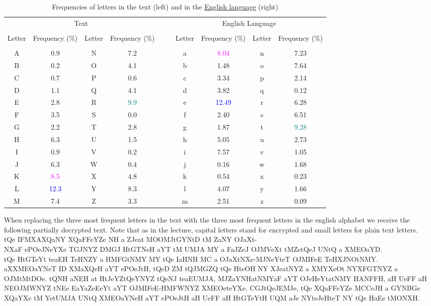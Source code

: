 \documentclass[12pt]{article}
\begin{document}
\begin{table}[h!]
	\centering
	\resizebox{\textwidth}{!} {
	\begin{tabular}{c c c c c c c c c c }
		\multicolumn{4}{c}{Text} && & \multicolumn{4}{c}{English Language}\\
		\cline{1-4} \cline{7-10}
		&&&&&&&&&\\[-3.3mm]
		Letter & Frequency (\%) & Letter & Frequency (\%) &&& Letter & Frequency (\%) & Letter & Frequency (\%)\\ [1mm]
		\cline{1-4} \cline{7-10}
		&&&&&&&&&\\[-3.5mm]
		A & 0.9 & N & 7.2&&&a & \textcolor{magenta}{8.04} & n & 7.23\\
		B & 0.2 & O & 4.1&&&b & 1.48 & o & 7.64\\
		C & 0.7 & P & 0.6&&&c & 3.34 & p & 2.14\\
		D & 1.1 & Q & 4.1&&&d & 3.82 & q & 0.12\\
		E & 2.8 & R & \textcolor{teal}{9.9}&&&e & \textcolor{blue}{12.49} & r & 6.28\\
		F & 3.5 & S & 0.0&&&f & 2.40 & s & 6.51\\
		G & 2.2 & T & 2.8&&&g & 1.87 & t & \textcolor{teal}{9.28}\\
		H & 6.3 & U & 1.5&&&h & 5.05 & u & 2.73\\
		I & 0.9 & V & 0.2&&&i & 7.57 & v & 1.05\\
		J & 6.3 & W & 0.4&&&j & 0.16 & w & 1.68\\
		K & \textcolor{magenta}{8.5} & X & 4.8&&&k & 0.54 & x & 0.23\\
		L & \textcolor{blue}{12.3} & Y & 8.3&&&l & 4.07 & y & 1.66\\
		M & 7.4 & Z & 3.3&&&m & 2.51 & z & 0.09\\
		\cline{1-4} \cline{7-10}
\end{tabular}}
\caption{Frequencies of letters in the text (left) and in the \href{http://norvig.com/mayzner.html}{English language} (right)}
\end{table}

When replacing the three most frequent letters in the text with the three most frequent letters in the english alphabet we receive the following partially decrypted text. Note that as in the lecture, capital letters stand for encrypted and small letters for plain text letters.
\newpage
tQe IFMXAXQaNY XQaFFeYZe NH a ZJeat MOOMJtGYNtD tM ZaNY OJaXt-\\NXaF ePOeJNeYXe TGJNYZ DMGJ HtGTNeH aYT tM UMJA MY a FaJZeJ OJMVeXt tMZetQeJ UNtQ a XMEOaYD.\\
tQe HtGTeYt teaEH TeHNZY a HMFGtNMY MY tQe IaHNH MC a OJaXtNXe-MJNeYteT OJMIFeE TeHXJNOtNMY. aXXMEOaYNeT ID XMaXQeH aYT ePOeJtH, tQeD ZM tQJMGZQ tQe HteOH NY XJeatNYZ a XMYXeOt NYXFGTNYZ a OJMtMtDOe. tQNH aNEH at HtJeYZtQeYNYZ tQeNJ teaEUMJA, MJZaYNHatNMYaF aYT OJeHeYtatNMY HANFFH, aH UeFF aH NEOJMWNYZ tNEe EaYaZeEeYt aYT OJMIFeE-HMFWNYZ XMEOeteYXe. CGJtQeJEMJe, tQe XQaFFeYZe MCCeJH a GYNBGe XQaYXe tM YetUMJA UNtQ XMEOaYNeH aYT ePOeJtH aH UeFF aH HtGTeYtH UQM aJe NYteJeHteT NY tQe HaEe tMONXH.\par
\end{document}
